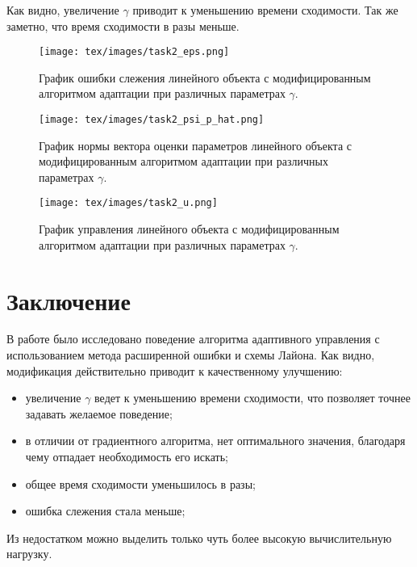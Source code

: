 \documentclass{article}
\begin{document}
 Как видно, увеличение \(\gamma\) приводит к уменьшению времени сходимости. Так же заметно, что время сходимости в разы меньше.
\begin{figure}[h!]
  \centering
  \texttt{[image: tex/images/task2\_eps.png]}
  \caption{График ошибки слежения линейного объекта с модифицированным алгоритмом адаптации при различных параметрах \(\gamma\).} 
  \label{fig:2_epsilon}
\end{figure}
\begin{figure}[h!]
  \centering
  \texttt{[image: tex/images/task2\_psi\_p\_hat.png]}
  \caption{График нормы вектора оценки параметров линейного объекта с модифицированным алгоритмом адаптации при различных параметрах \(\gamma\).} 
  \label{fig:2_psi_p_hat_hat}
\end{figure}
\begin{figure}[h!]
  \centering
  \texttt{[image: tex/images/task2\_u.png]}
  \caption{График управления линейного объекта с модифицированным алгоритмом адаптации при различных параметрах \(\gamma\).} 
  \label{fig:2_u}
\end{figure}

\FloatBarrier
\newpage
\section{Заключение}
В работе было исследовано поведение алгоритма адаптивного управления с использованием метода расширенной ошибки и схемы Лайона. Как видно, модификация действительно приводит к качественному улучшению:
\begin{itemize}
  \item увеличение \(\gamma\) ведет к уменьшению времени сходимости, что позволяет точнее задавать желаемое поведение;
  \item в отличии от градиентного алгоритма, нет оптимального значения, благодаря чему отпадает необходимость его искать;
  \item общее время сходимости уменьшилось в разы;
  \item ошибка слежения стала меньше;
\end{itemize}
Из недостатком можно выделить только чуть более высокую вычислительную нагрузку.
\end{document}
